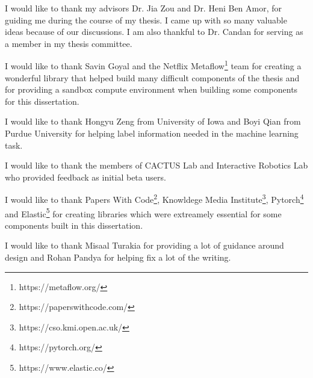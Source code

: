 I would like to thank my advisors Dr. Jia Zou and Dr. Heni Ben Amor, for guiding me during the course of my thesis. I came up with so many valuable ideas because of our discussions. I am also thankful to Dr. Candan for serving as a member in my thesis committee. 

I would like to thank Savin Goyal and the Netflix Metaflow\footnote{https://metaflow.org/} team for creating a wonderful library that helped build many difficult components of the thesis and for providing a sandbox compute environment when building some components for this dissertation. 

I would like to thank Hongyu Zeng from University of Iowa and Boyi Qian from Purdue University for helping label information needed in the machine learning task. 

I would like to thank the members of CACTUS Lab and Interactive Robotics Lab who provided feedback as initial beta users. 

I would like to thank Papers With Code\footnote{https://paperswithcode.com/}, Knowldege Media Institute\footnote{https://cso.kmi.open.ac.uk/}, Pytorch\footnote{https://pytorch.org/} and Elastic\footnote{https://www.elastic.co/} for creating libraries which were extreamely essential for some components built in this dissertation. 

I would like to thank Misaal Turakia for providing a lot of guidance around design and Rohan Pandya for helping fix a lot of the writing. 